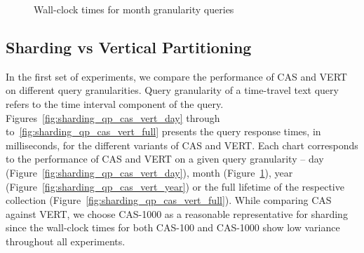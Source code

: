\begin{figure}[tb]
  	\centering
	  \quad
   	\caption{Wall-clock times for month granularity queries}
\label{fig:sharding_qp_cas_vert_month}
\end{figure}


\subsection{Sharding vs Vertical Partitioning}

In the first set of experiments, we compare the performance of
CAS and VERT on different query granularities. Query granularity of a time-travel text query refers to the time interval component of the query. Figures~\ref{fig:sharding_qp_cas_vert_day} through to~\ref{fig:sharding_qp_cas_vert_full} presents the query response times, in milliseconds, for the different variants of CAS and VERT. Each chart corresponds to the performance of CAS and VERT on a given query granularity -- day (Figure~\ref{fig:sharding_qp_cas_vert_day}), month (Figure~\ref{fig:sharding_qp_cas_vert_month}), year (Figure~\ref{fig:sharding_qp_cas_vert_year}) or the full lifetime of the respective collection (Figure~\ref{fig:sharding_qp_cas_vert_full}). While comparing CAS against VERT, we choose CAS-1000 as a reasonable representative for sharding since the wall-clock times for both CAS-100 and CAS-1000 show low variance throughout all experiments.

